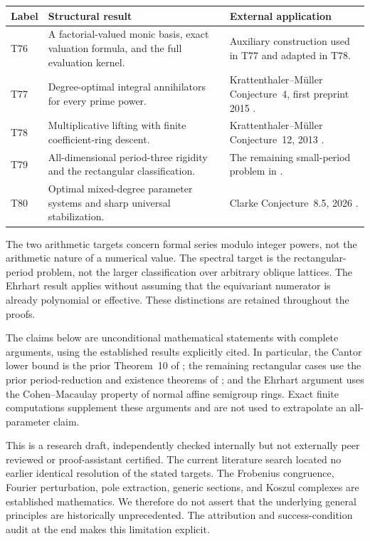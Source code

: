 \documentclass[11pt,a4paper]{article}
\theoremstyle{definition}
\theoremstyle{remark}\newtheorem{remark}[lemma]{Remark}
\begin{document}
\begin{center}\small
\begin{tabular}{@{}p{}p{}p{}@{}}
\toprule
Label & Structural result & External application \\
\midrule
T76 & A factorial-valued monic basis, exact valuation formula, and the full evaluation kernel. & Auxiliary construction used in T77 and adapted in T78.\\
T77 & Degree-optimal integral annihilators for every prime power. & Krattenthaler--M\"uller Conjecture~4, first preprint 2015 \cite{KMp}.\\
T78 & Multiplicative lifting with finite coefficient-ring descent. & Krattenthaler--M\"uller Conjecture~12, 2013 \cite{KM3}.\\
T79 & All-dimensional period-three rigidity and the rectangular classification. & The remaining small-period problem in \cite[Section~4.4]{CFK}.\\
T80 & Optimal mixed-degree parameter systems and sharp universal stabilization. & Clarke Conjecture~8.5, 2026 \cite{Clarke26}.\\
\bottomrule
\end{tabular}
\end{center}

The two arithmetic targets concern formal series modulo integer powers, not
the arithmetic nature of a numerical value. The spectral target is the
rectangular-period problem, not the larger classification over arbitrary
oblique lattices. The Ehrhart result applies without assuming that the
equivariant numerator is already polynomial or effective. These distinctions
are retained throughout the proofs.

The claims below are unconditional mathematical statements with complete
arguments, using the established results explicitly cited. In particular,
the Cantor lower bound is the prior Theorem~10 of \cite{KM3}; the remaining
rectangular cases use the prior period-reduction and existence theorems of
\cite{CFK}; and the Ehrhart argument uses the Cohen--Macaulay property of
normal affine semigroup rings. Exact finite computations supplement these
arguments and are not used to extrapolate an all-parameter claim.

This is a research draft, independently checked internally but not externally
peer reviewed or proof-assistant certified. The current literature search
located no earlier identical resolution of the stated targets. The
Frobenius congruence, Fourier perturbation, pole extraction, generic sections,
and Koszul complexes are established mathematics. We therefore do not assert
that the underlying general principles are historically unprecedented.
The attribution and success-condition audit at the end makes this limitation
explicit.
\end{document}

